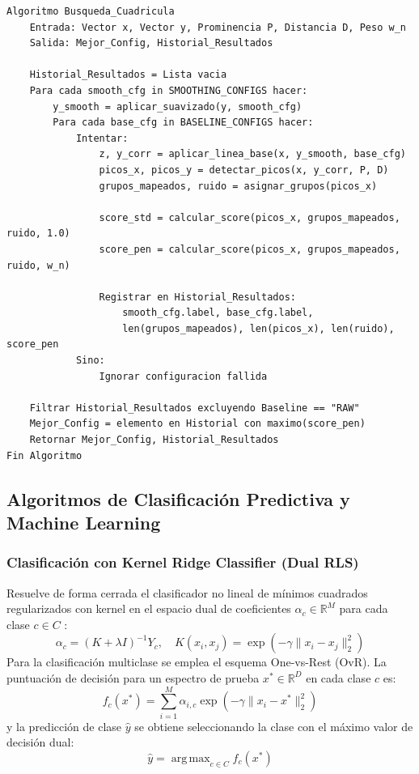\begin{lstlisting}[caption=Algoritmo Modular Combinatorio de Busqueda en Cuadricula]
Algoritmo Busqueda_Cuadricula
    Entrada: Vector x, Vector y, Prominencia P, Distancia D, Peso w_n
    Salida: Mejor_Config, Historial_Resultados

    Historial_Resultados = Lista vacia
    Para cada smooth_cfg in SMOOTHING_CONFIGS hacer:
        y_smooth = aplicar_suavizado(y, smooth_cfg)
        Para cada base_cfg in BASELINE_CONFIGS hacer:
            Intentar:
                z, y_corr = aplicar_linea_base(x, y_smooth, base_cfg)
                picos_x, picos_y = detectar_picos(x, y_corr, P, D)
                grupos_mapeados, ruido = asignar_grupos(picos_x)
                
                score_std = calcular_score(picos_x, grupos_mapeados, ruido, 1.0)
                score_pen = calcular_score(picos_x, grupos_mapeados, ruido, w_n)
                
                Registrar en Historial_Resultados:
                    smooth_cfg.label, base_cfg.label,
                    len(grupos_mapeados), len(picos_x), len(ruido), score_pen
            Sino:
                Ignorar configuracion fallida
                
    Filtrar Historial_Resultados excluyendo Baseline == "RAW"
    Mejor_Config = elemento en Historial con maximo(score_pen)
    Retornar Mejor_Config, Historial_Resultados
Fin Algoritmo
\end{lstlisting}

\subsection{Algoritmos de Clasificación Predictiva y Machine Learning}

\subsubsection{Clasificación con Kernel Ridge Classifier (Dual RLS)}
Resuelve de forma cerrada el clasificador no lineal de mínimos cuadrados regularizados con kernel en el espacio dual de coeficientes $\alpha_c \in \mathbb{R}^M$ para cada clase $c \in C$ \cite{hoerl1970}:
\begin{equation}
    \alpha_c = (K + \lambda I)^{-1} Y_c, \quad K(x_i, x_j) = \exp\left(-\gamma \|x_i - x_j\|_2^2\right)
\end{equation}
Para la clasificación multiclase se emplea el esquema One-vs-Rest (OvR). La puntuación de decisión para un espectro de prueba $x^* \in \mathbb{R}^D$ en cada clase $c$ es:
\begin{equation}
    f_c(x^*) = \sum_{i=1}^M \alpha_{i,c} \exp\left(-\gamma \|x_i - x^*\|_2^2\right)
\end{equation}
y la predicción de clase $\hat{y}$ se obtiene seleccionando la clase con el máximo valor de decisión dual:
\begin{equation}
    \hat{y} = \operatorname{arg\,max}_{c \in C} f_c(x^*)
\end{equation}

